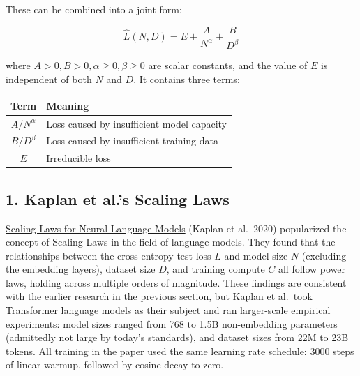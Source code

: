 \documentclass[
  english,
  11pt,
  a4paper,
]{article}
\newcounter{none} %
\newenvironment{NotesFormula}{%
  \par\noindent\begin{minipage}{\linewidth}%
  \setlength{\parindent}{2em}%
  \setlength{\parskip}{0.35em}%
}{\end{minipage}\par}
\begin{document}
\begin{NotesFormula}

These can be combined into a joint form:

\[\boxed{\hat L(N,D)=E+\frac{A}{N^\alpha}+\frac{B}{D^\beta}}\]

\end{NotesFormula}

where \(A>0,B>0,\alpha\ge0,\beta\ge0\) are scalar constants, and the
value of \(E\) is independent of both \(N\) and \(D\). It contains three
terms:

{\def\LTcaptype{none} %
\begin{longtable}[]{@{}cl@{}}
\toprule\noalign{}
\textbf{Term} & \textbf{Meaning} \\
\midrule\noalign{}
\endhead
\bottomrule\noalign{}
\endlastfoot
\(A/N^\alpha\) & Loss caused by insufficient model capacity \\
\(B/D^\beta\) & Loss caused by insufficient training data \\
\(E\) & Irreducible loss \\
\end{longtable}
}

\clearpage

\subsection{1. Kaplan et al.'s Scaling
Laws}\label{kaplan-et-al.s-scaling-laws}

\href{https://arxiv.org/abs/2001.08361}{Scaling Laws for Neural Language
Models} (Kaplan et al.~2020) popularized the concept of Scaling Laws in
the field of language models. They found that the relationships between
the cross-entropy test loss \(L\) and model size \(N\) (excluding the
embedding layers), dataset size \(D\), and training compute \(C\) all
follow power laws, holding across multiple orders of magnitude. These
findings are consistent with the earlier research in the previous
section, but Kaplan et al.~took Transformer language models as their
subject and ran larger-scale empirical experiments: model sizes ranged
from 768 to 1.5B non-embedding parameters (admittedly not large by
today's standards), and dataset sizes from 22M to 23B tokens. All
training in the paper used the same learning rate schedule: 3000 steps
of linear warmup, followed by cosine decay to zero.
\end{document}
